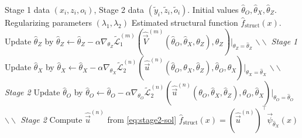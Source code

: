 \begin{algorithm}
    \caption{Deep Feature Instrumental Variable with Observable Confounder}
    \begin{algorithmic}[1]  \label{algo2}
    \renewcommand{\algorithmicrequire}{\textbf{Input:}}
    \renewcommand{\algorithmicensure}{\textbf{Output:}}
    \REQUIRE Stage 1 data $(x_i, z_i, o_i)$, Stage 2 data $(\tilde y_i, \tilde z_i, \tilde o_i)$. Initial values $\hat{\theta}_O,\hat{\theta}_X,\hat{\theta}_Z$. Regularizing parameters $(\lambda_1, \lambda_2)$
    \ENSURE Estimated structural function $\hat{f}_\mathrm{struct}(x)$.
       \STATE Update $\hat{\theta}_Z$ by $\hat{\theta}_Z \leftarrow \hat{\theta}_Z - \alpha\nabla_{\theta_{Z}} \tilde{\mathcal{L}}^{(m)}_1(\hat{\vec{V}}^{(m)}(\hat{\theta}_O,\hat{\theta}_X,\theta_Z),\theta_Z)|_{\theta_{Z}=\hat{\theta}_Z}$ \hspace{1mm}\textit{$\backslash\backslash$ Stage 1}
     \ENDWHILE
       \STATE Update $\hat{\theta}_X$ by $\hat{\theta}_X \leftarrow \hat{\theta}_X - \alpha\nabla_{\theta_X} \tilde{\mathcal{L}}^{(n)}_2(\hat{\vec{u}}^{(n)}(\hat{\theta}_O,\theta_X,\hat{\theta}_Z),\hat{\theta}_O,\theta_X)|_{\theta_X=\hat{\theta}_X}$ \hspace{1mm}\textit{$\backslash\backslash$ Stage 2}
       \STATE Update $\hat{\theta}_O$ by $\hat{\theta}_O \leftarrow \hat{\theta}_O - \alpha\nabla_{\theta_O} \tilde{\mathcal{L}}^{(n)}_2(\hat{\vec{u}}^{(n)}(\theta_O,\hat{\theta}_X,\hat{\theta}_Z),\theta_O,\hat{\theta}_X)|_{\theta_O=\hat{\theta}_O}$ \hspace{2mm}\textit{$\backslash\backslash$ Stage 2}
     \ENDWHILE
     \STATE Compute $\hat{\vec{u}}^{(n)}$ from \eqref{eq:stage2-sol}
    \RETURN $\hat{f}_\mathrm{struct}(x) = (\hat{\vec{u}}^{(n)})^\top \vec{\psi}_{\hat{\theta}_X}(x)$ 
    \end{algorithmic} 
    \end{algorithm}
   
